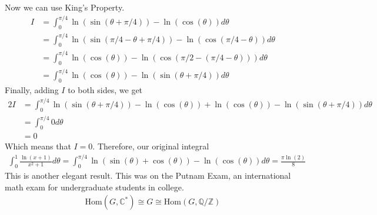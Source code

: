 \documentclass[12pt]{article}
\def\mbb#1{\mathbb{#1}}
\theoremstyle{definition}
\theoremstyle{remark}
\begin{document}
    Now we can use King's Property.
    \begin{align*}
        I &= \int_{0}^{\pi/4} \ln(\sin(\theta+\pi/4)) - \ln(\cos(\theta))d\theta \\ 
        &= \int_{0}^{\pi/4} \ln(\sin(\pi/4 - \theta + \pi/4)) - \ln(\cos(\pi/4 - \theta))d\theta \\ 
        &= \int_{0}^{\pi/4} \ln(\cos(\theta)) - \ln(\cos(\pi/2 - (\pi/4 -\theta)))d\theta \\ 
        &= \int_{0}^{\pi/4} \ln(\cos(\theta)) - \ln(\sin(\theta + \pi/4))d\theta
    \end{align*}
    Finally, adding $I$ to both sides, we get 
    \begin{align*}
        2I &= \int_{0}^{\pi/4} \ln(\sin(\theta + \pi/4)) - \ln(\cos(\theta)) + \ln(\cos(\theta)) - \ln(\sin(\theta+\pi/4))d\theta \\ 
        &= \int_{0}^{\pi/4} 0d\theta \\ 
        &= 0
    \end{align*}
    Which means that $I = 0$. 
    Therefore, our original integral 
    \begin{align*}
        \int_{0}^{1} \frac{\ln(x+1)}{x^2+1}d\theta = \int_{0}^{\pi/4} \ln(\sin(\theta)+\cos(\theta)) - \ln(\cos(\theta))d\theta = \frac{\pi \ln(2)}{8}
    \end{align*}
    This is another elegant result. This was on the Putnam Exam, an international math exam for undergraduate students in college.
    \begin{align*}
        \mathrm{Hom}(G, \mbb{C}^*) \cong G \cong \mathrm{Hom}(G, \mbb{Q}/\mbb{Z})
    \end{align*}
\end{document}
